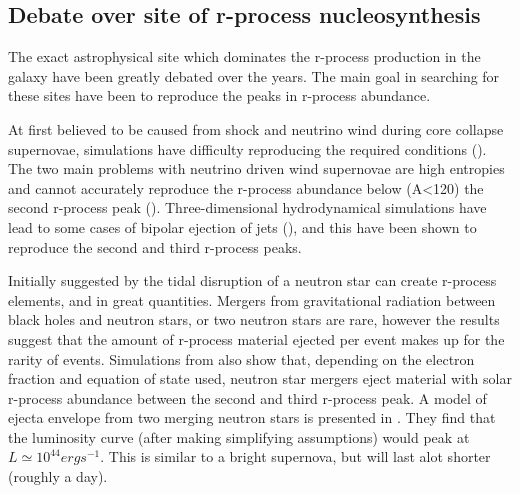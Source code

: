 \subsection{Debate over site of r-process nucleosynthesis} \label{sec:theory-debate} 
The exact astrophysical site which dominates the r-process production in the galaxy have been greatly debated over the years.
The main goal in searching for these sites have been to reproduce the peaks in r-process abundance.

At first believed to be caused from shock and neutrino wind during core collapse supernovae, simulations have difficulty reproducing the required conditions ().
The two main problems with neutrino driven wind supernovae are high entropies and cannot accurately reproduce the r-process abundance below (A<120) the second r-process peak ().
Three-dimensional hydrodynamical simulations have lead to some cases of bipolar ejection of jets (), and this have been shown to reproduce the second and third r-process peaks.

Initially suggested by  the tidal disruption of a neutron star can create r-process elements, and in great quantities.
Mergers from gravitational radiation between black holes and neutron stars, or two neutron stars are rare, however the results  suggest that the amount of r-process material ejected per event makes up for the rarity of events.
Simulations from  also show that, depending on the electron fraction and equation of state used, neutron star mergers eject material with solar r-process abundance between the second and third r-process peak.
A model of ejecta envelope from two merging neutron stars is presented in .
They find that the luminosity curve (after making simplifying assumptions) would peak at $L \simeq 10^{44} erg s^{-1}$.
This is similar to a bright supernova, but will last alot shorter (roughly a day).
